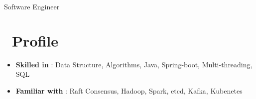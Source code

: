 \documentclass{resume}
\begin{document}

\centerline{Software Engineer}
\vspace{2ex}

\section{\faCogs\ Profile}
\begin{itemize}[parsep=0.5ex]
  \item \textbf{Skilled in} : Data Structure, Algorithms, Java, Spring-boot, Multi-threading, SQL
  \item \textbf{Familiar with} : Raft Consensus, Hadoop, Spark, etcd, Kafka, Kubenetes
\end{itemize}
\end{document}
